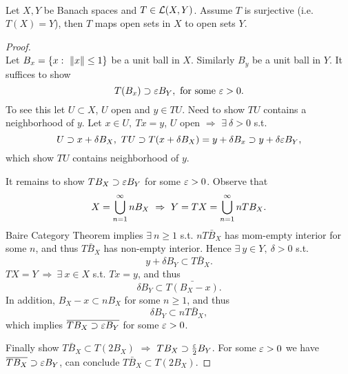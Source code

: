\vspace{3pt}
\begin{theorem}\ \\
Let $X,Y$ be Banach spaces and $T \in \mathcal{L}(X,Y)$. Assume $T$ is surjective (i.e. $T(X) = Y$), then $T$ maps open sets in $X$ to open sets $Y$.
\end{theorem}
\begin{proof}\ \\
Let $B_x = \{x:\ \norm{x} \leq 1\}$ be a unit ball in $X$. Similarly $B_y$ be a unit ball in $Y$. It suffices to show 
\begin{equation*}
    T(B_x) \supset \varepsilon B_Y,\ \text{for some } \varepsilon > 0.
\end{equation*}
To see this let $U \subset X$, $U$ open and $y \in TU$. Need to show $TU$ contains a neighborhood of $y$. Let $x \in U,\ T x = y$, $U$ open $\Rightarrow$ $\exists\ \delta > 0$ s.t.
\begin{equation*}
    U \supset x + \delta B_X,\ TU \supset T(x + \delta B_X) = y+ \delta B_x \supset y + \delta \varepsilon B_Y,
\end{equation*}
which show $TU$ contains neighborhood of $y$.

\np It remains to show $TB_X \supset \varepsilon B_Y$ for some $\varepsilon > 0$. Observe that 
\begin{equation*}
    X = \cupp{n=1}{\infty} n B_X\ \Rightarrow\ Y = TX = \cupp{n=1}{\infty} nTB_X.
\end{equation*}
Baire Category Theorem implies $\exists\ n \geq 1$ s.t. $n\bar{TB_X}$ has mom-empty interior for some $n$, and thus $\bar{TB_X}$ has non-empty interior. Hence $\exists\ y \in Y,\ \delta > 0$ s.t.
\begin{equation*}
    y + \delta B_Y \subset \bar{TB_X}.
\end{equation*}
$TX = Y\ \Rightarrow\ \exists\ x \in X$ s.t. $Tx = y$, and thus
\begin{equation*}
    \delta B_Y \subset \bar{T(B_X - x)}.
\end{equation*}
In addition, $B_X - x \subset n B_X$ for some $n \geq 1$, and thus
\begin{equation*}
    \delta B_Y \subset n \bar{TB_X},
\end{equation*}
which implies $\overline{TB_X \supset \varepsilon B_Y}$ for some $\varepsilon > 0$.

\np Finally show $\bar{TB_X} \subset T(2B_X)$ $\Rightarrow$ $TB_X \supset \frac{\varepsilon}{2} B_Y$. For some $\varepsilon > 0$ we have $\overline{TB_X} \supset \varepsilon B_Y$, can conclude $\bar{TB_X} \subset T (2B_X)$.


\end{proof}
